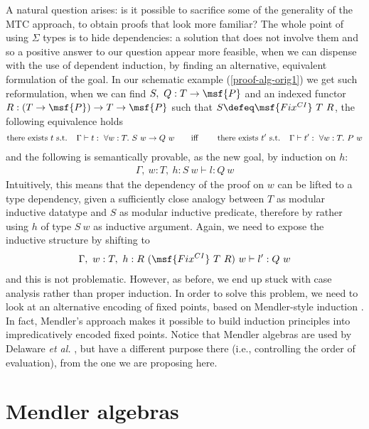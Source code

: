 \documentclass[submission,copyright,creativecommons]{eptcs}
\newcounter{prop}
\begin{document}
A natural question arises: is it possible to sacrifice some of the
generality of the MTC approach, to obtain proofs that look more
familiar?
The whole point of using $\Sigma$ types is to hide dependencies: a
solution that does not involve them and so a positive answer to our
question appear more feasible, when we can dispense with the use of
dependent induction, by finding an alternative, equivalent formulation
of the goal. In our schematic example (\ref{proof-alg-orig1}) we get
such reformulation, when we can find $S, \ Q: T \to \msf{P}$ and an
indexed functor $R: (T \to \msf{P}) \to T \to \msf{P} $ such that $S
\defeq \msf{Fix^{CI}} \ T \ R$, the following equivalence holds
\begin{gather} \label{def:agrees}
\mbox{there exists } t \mbox{ s.t. } \ \ \Gamma \vdash t: \ \forall w:
T. \ S \ w \to Q \ w \qquad \mbox{iff \qquad there exists } t' \mbox{
  s.t. } \ \ \Gamma \vdash t': \ \forall w:T. \ P \ w
\end{gather}
and the following is semantically provable, as the new goal, by
induction on $h$:
\begin{gather} \label{def:alter}
 \Gamma, \ w: T, \ h: S \ w \vdash l: Q \ w  \end{gather} 
Intuitively, this means that the dependency of the proof on $w$ can be
lifted to a type dependency, given a sufficiently close analogy
between $T$ as modular inductive datatype and $S$ as modular inductive
predicate, therefore by rather using $h$ of type $S \ w$ as inductive
argument.
Again, we need to expose the inductive structure by shifting to
\begin{gather} 
\label{proof-alg-last}
 \Gamma, \ w: T, \ h: R \ (\msf{Fix^{CI}} \ T \ R) \ w \vdash l': Q
 \ w \end{gather}
and this is not problematic.
However, as before, we end up stuck with case analysis rather than
proper induction. In order to solve this problem, we need to look at
an alternative encoding of fixed points, based on Mendler-style
induction \cite{Mendler91,AbelMU05}. In fact, Mendler's approach makes
it possible to build induction principles into impredicatively encoded
fixed points. Notice that Mendler algebras are used by Delaware
\emph{et al.} \cite{Dela13}, but have a different purpose there (i.e.,
controlling the order of evaluation), from the one we are proposing
here.


\section{Mendler algebras} \label{section:two}
\end{document}
